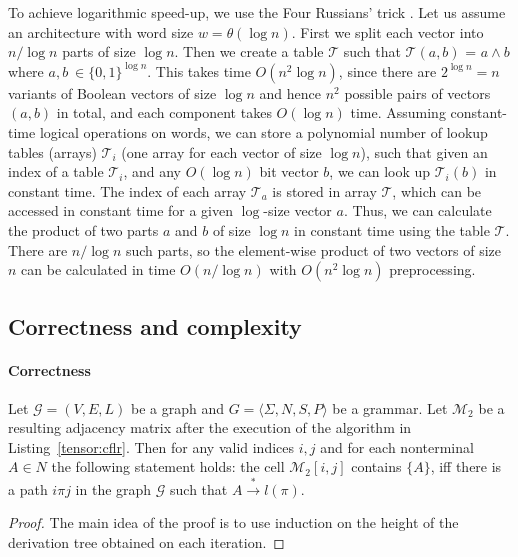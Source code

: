 To achieve logarithmic speed-up, we use the Four Russians' trick \cite{arlazarov1970economical}.
Let us assume an architecture with word size $w= \theta(\log n)$.
First we split each vector into $n/\log n$ parts of size $\log n$.
Then we create a table $\mathcal{T}$ such that $\mathcal{T}(a, b)$ = $a \wedge b$ where $a, b \ \in {\{0,1\}}^{\log n}$.
This takes time $O(n^2 \log n)$, since there are $2^{\log n} = n$ variants of Boolean vectors of size $\log n$ and hence $n^2$ possible pairs of vectors $(a, b)$ in total, and each component takes $O(\log n)$ time.
Assuming constant-time logical operations on words, we can store a polynomial number of lookup tables (arrays) $\mathcal{T}_i$ (one array for each vector of size $\log n$), such that given an index of a table $\mathcal{T}_i$, and any $O(\log n)$ bit vector $b$, we can look up $\mathcal{T}_i(b)$ in constant time. The index of each array $\mathcal{T}_a$ is stored in array $\mathcal{T}$, which can be accessed in constant time for a given $\log$-size vector $a$. Thus, we can calculate the product of two parts $a$ and $b$ of size $\log n$ in constant time using the table $\mathcal{T}$.
There are $n/\log n$ such parts, so the element-wise product of two vectors of size $n$ can be calculated in time $O(n/\log n)$ with $O(n^2 \log n)$ preprocessing.



\subsection{Correctness and complexity}

\paragraph*{Correctness}
\begin{theorem}
    Let $\mathcal{G} = (V,E,L)$ be a graph and $G = \langle\Sigma, N, S, P\rangle$ be a grammar.
    Let $\mathcal{M}_{2}$ be a resulting adjacency matrix after the execution of the algorithm in Listing~\ref{tensor:cflr}. Then for any valid indices $i, j$ and for each nonterminal $A \in N$ the following statement holds: the cell $\mathcal{M}_2[i,j]$ contains $\{A\}$, iff there is a path $i\pi j$ in the graph $\mathcal{G}$ such that $ A \xrightarrow{*} l(\pi)$.
\end{theorem}
\begin{proof}
    The main idea of the proof is to use induction on the height of the derivation tree obtained on each iteration.
\end{proof}


